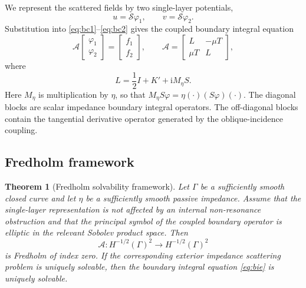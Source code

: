 \documentclass[10pt,a4paper]{amsart}
\numberwithin{equation}{section}
\newtheorem{theorem}{Theorem}[section]
\newcommand{\ii}{\mathrm{i}}
\begin{document}
We represent the scattered fields by two single-layer potentials,
\begin{equation}
u=\mathcal S\varphi_1,\qquad v=\mathcal S\varphi_2.
\end{equation}
Substitution into \eqref{eq:bc1}--\eqref{eq:bc2} gives the coupled boundary integral equation
\begin{equation}
\mathcal A
\begin{bmatrix}\varphi_1\\ \varphi_2\end{bmatrix}
=
\begin{bmatrix}f_1\\ f_2\end{bmatrix},
\qquad
\mathcal A=
\begin{bmatrix}
L&-\mu T\\
\mu T&L
\end{bmatrix},
\label{eq:bie}
\end{equation}
where
\begin{equation}
L=\frac12 I+K'+\ii M_\eta S .
\end{equation}
Here $M_\eta$ is multiplication by $\eta$, so that $M_\eta S\varphi=\eta(\cdot)(S\varphi)(\cdot)$. The diagonal blocks are scalar impedance boundary integral operators. The off-diagonal blocks contain the tangential derivative operator generated by the oblique-incidence coupling.

\subsection{Fredholm framework}


\begin{theorem}[Fredholm solvability framework]
Let $\Gamma$ be a sufficiently smooth closed curve and let $\eta$ be a sufficiently smooth passive impedance. Assume that the single-layer representation is not affected by an internal non-resonance obstruction and that the principal symbol of the coupled boundary operator is elliptic in the relevant Sobolev product space. Then
\[
\mathcal A:H^{-1/2}(\Gamma)^2\to H^{-1/2}(\Gamma)^2
\]
is Fredholm of index zero. If the corresponding exterior impedance scattering problem is uniquely solvable, then the boundary integral equation \eqref{eq:bie} is uniquely solvable.
\end{theorem}
\end{document}
